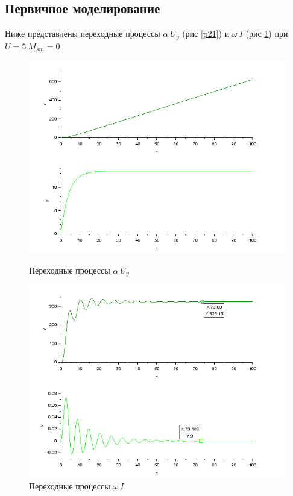 \documentclass[a4paper,12pt,russian]{article} %
\begin{document}
\subsection{Первичное моделирование}
Ниже представлены переходные процессы  $\alpha\:  U_y$ (рис \ref{p21}) и $\omega\:  I$ (рис \ref{p22})  при  $U=5\: M_{sm}=0$.

\begin{figure}[H]
		\includegraphics[width=\linewidth]{21.png}
		\caption{Переходные процессы $\alpha\:  U_y$}\label{p21}
	\endminipage\hfill
		\includegraphics[width=\linewidth]{22.png}
		\caption{Переходные процессы $\omega\:  I$}\label{p22}
	\endminipage
\end{figure}
\end{document}
